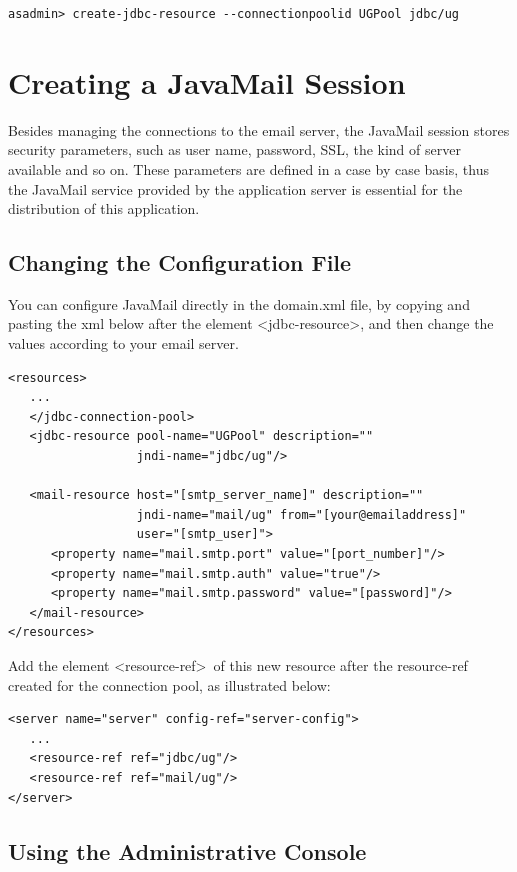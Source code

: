 \documentclass[envcountsame,envcountchap]{svmono}
\begin{document}
\begin{verbatim}
asadmin> create-jdbc-resource --connectionpoolid UGPool jdbc/ug
\end{verbatim}

\section{Creating a JavaMail Session}

Besides managing the connections to the email server, the JavaMail session stores security parameters, such as user name, password, SSL, the kind of server available and so on. These parameters are defined in a case by case basis, thus the JavaMail service provided by the application server is essential for the distribution of this application.

\subsection{Changing the Configuration File}

You can configure JavaMail directly in the domain.xml file, by copying and pasting the xml below after the element \textless jdbc-resource\textgreater, and then change the values according to your email server.

\begin{verbatim}
<resources>
   ...
   </jdbc-connection-pool>
   <jdbc-resource pool-name="UGPool" description="" 
                  jndi-name="jdbc/ug"/>

   <mail-resource host="[smtp_server_name]" description="" 
                  jndi-name="mail/ug" from="[your@emailaddress]"
                  user="[smtp_user]">
      <property name="mail.smtp.port" value="[port_number]"/>
      <property name="mail.smtp.auth" value="true"/>
      <property name="mail.smtp.password" value="[password]"/>
   </mail-resource>
</resources>
\end{verbatim}

Add the element \textless resource-ref\textgreater \ of this new resource after the resource-ref created for the connection pool, as illustrated below:

\begin{verbatim}
<server name="server" config-ref="server-config">
   ...
   <resource-ref ref="jdbc/ug"/>
   <resource-ref ref="mail/ug"/>
</server>
\end{verbatim}

\subsection{Using the Administrative Console}
\end{document}
